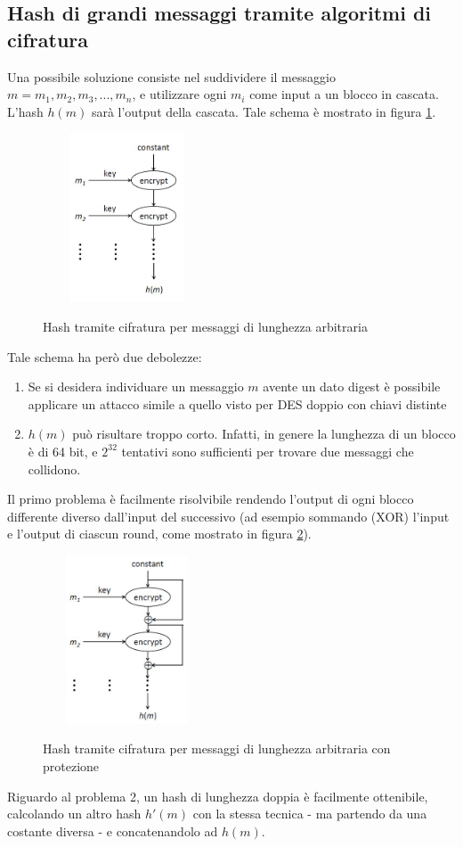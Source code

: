 \subsection{Hash di grandi messaggi tramite algoritmi di cifratura}
Una possibile soluzione consiste nel suddividere il messaggio $m = m_{1},m_{2},m_{3},...,m_{n}$, e utilizzare ogni $m_{i}$ come input a un blocco in cascata. L'hash $h(m)$ sarà l'output della cascata. Tale schema è mostrato in figura \ref{fig:hash_lung_ar}.
\begin{figure}
	\begin{center}
	{\includegraphics[height=5cm, width=5cm, keepaspectratio]{Immagini/hash/schema_des_come_hash_1.JPG}}
	\caption{Hash tramite cifratura per messaggi di lunghezza arbitraria \label{fig:hash_lung_ar}}
	\end{center}
\end{figure}
Tale schema ha però due debolezze:
\begin{enumerate}
\item Se si desidera individuare un messaggio $m$ avente un dato digest è possibile applicare un attacco simile a quello visto per DES doppio con chiavi distinte
\item $h(m)$ può risultare troppo corto. Infatti, in genere la lunghezza di un blocco è di 64 bit, e $2^{32}$ tentativi sono sufficienti per trovare due messaggi che collidono.
\end{enumerate}
Il primo problema è facilmente risolvibile rendendo l'output di ogni blocco differente diverso dall'input del successivo (ad esempio sommando (XOR) l'input e l'output di ciascun round, come mostrato in figura \ref{fig:hash_lung_ar_2}). 
\begin{figure}
	\begin{center}
	{\includegraphics[height=5cm, width=5cm, keepaspectratio]{Immagini/hash/schema_des_come_hash_2.JPG}}
	\caption{Hash tramite cifratura per messaggi di lunghezza arbitraria con protezione\label{fig:hash_lung_ar_2}}
	\end{center}
\end{figure}
\newline \newline
Riguardo al problema 2, un hash di lunghezza doppia è facilmente ottenibile, calcolando un altro hash $h'(m)$ con la stessa tecnica - ma partendo da una costante diversa - e concatenandolo ad $h(m)$.